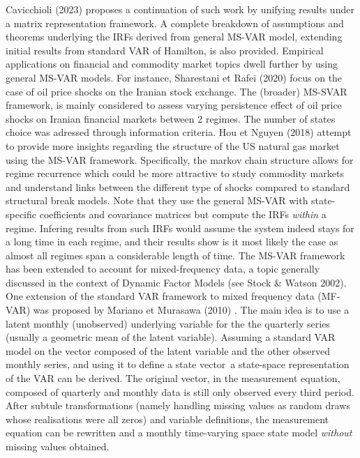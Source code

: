 Cavicchioli (2023) \cite{Maddalena} proposes a continuation of such work by unifying results under a matrix representation framework. A complete breakdown of assumptions and theorems underlying the IRFs derived from general MS-VAR model, extending initial results from standard VAR of Hamilton, is also provided.
\bigbreak
Empirical applications on financial and commodity market topics dwell further by using general MS-VAR models.
For instance, Sharestani et Rafei (2020) \cite{Iran} focus on the case of oil price shocks on the Iranian stock exchange. 
The (broader) MS-SVAR framework, is mainly considered to assess varying persistence effect of oil price shocks on Iranian financial markets between 2 regimes.
The number of states choice was adressed through information criteria.
Hou et Nguyen (2018) \cite{Hou} attempt to provide more insights regarding the structure of the US natural gas market using the MS-VAR framework. 
Specifically, the markov chain structure allows for regime recurrence which could be more attractive to study commodity markets and understand links between the different type of shocks compared to standard structural break models.
Note that they use the general MS-VAR with state-specific coefficients and covariance matrices but compute the IRFs \textit{within} a regime.
Infering results from such IRFs would assume the system indeed stays for a long time in each regime, and their results show is it most likely the case as almost all regimes span a considerable length of time.
\bigbreak
The MS-VAR framework has been extended to account for mixed-frequency data, a topic generally discussed in the context of Dynamic Factor Models (see Stock \& Watson 2002).
One extension of the standard VAR framework to mixed frequency data (MF-VAR) was proposed by Mariano et Murasawa (2010) \cite{MM}. 
The main idea is to use a latent monthly (unobserved) underlying variable for the the quarterly series (usually a geometric mean of the latent variable). 
Assuming a standard VAR model on the vector composed of the latent variable and the other observed monthly series, and using it to define a state vector\footnotemark \, a state-space representation of the VAR can be derived. 
The original vector, in the measurement equation, composed of quarterly and monthly data is still only observed every third period.
After subtule transformations (namely handling missing values as random draws whose realisations were all zeros) and variable definitions, the measurement equation can be rewritten and a monthly time-varying space state model \textit{without} missing values obtained.
